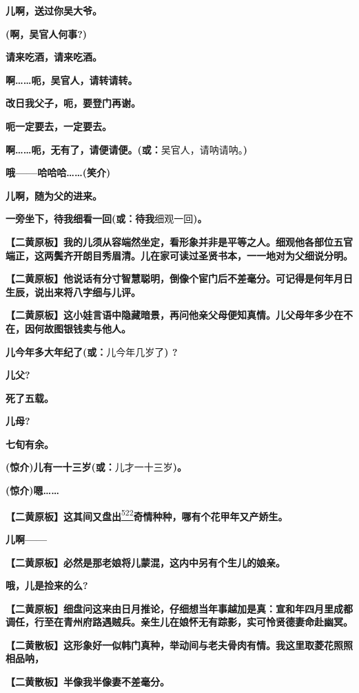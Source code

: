 \textbf{儿啊，送过你吴大爷。}

\textbf{(啊，吴官人何事?)}

\textbf{请来吃酒，请来吃酒。}

\textbf{啊\ldots{}\ldots{}呃，吴官人，请转请转。}

\textbf{改日我父子，呃，要登门再谢。}

\textbf{呃一定要去，一定要去。}

\textbf{啊\ldots{}\ldots{}呃，无有了，请便请便。(或：}吴官人，请呐请呐。\textbf{)}

\textbf{哦------哈哈哈\ldots{}\ldots{}(笑介)}

\textbf{儿啊，随为父的进来。}

\textbf{一旁坐下，待我细看一回(或：待我}细观一回\textbf{)。}

\textbf{【二黄原板】我的儿须从容端然坐定，看形象并非是平等之人。细观他各部位五官端正，这两鬓齐开朗目秀眉清。儿在家可读过圣贤书本，一一地对为父细说分明。}

\textbf{【二黄原板】他说话有分寸智慧聪明，倒像个宦门后不差毫分。可记得是何年月日生辰，说出来将八字细与儿评。}

\textbf{【二黄原板】这小娃言语中隐藏暗景，再问他亲父母便知真情。儿父母年多少在不在，因何故图银钱卖与他人。}

\textbf{儿今年多大年纪了(或：}儿今年几岁了\textbf{) ?}

\textbf{儿父?}

\textbf{死了五载。}

\textbf{儿母?}

\textbf{七旬有余。}

\textbf{(惊介)儿有一十三岁(或：}儿才一十三岁\textbf{)。}

\textbf{(惊介)嗯\ldots{}\ldots{}}

\textbf{【二黄原板】这其间又盘出}\protect\hyperlink{fn522}{\textsuperscript{522}}\textbf{奇情种种，哪有个花甲年又产娇生。}

\textbf{儿啊------}

\textbf{【二黄原板】必然是那老娘将儿蒙混，这内中另有个生儿的娘亲。}

\textbf{哦，儿是捡来的么?}

\textbf{【二黄原板】细盘问这来由日月推论，仔细想当年事越加是真：宣和年四月里成都调任，行至在青州府路遇贼兵。亲生儿在娘怀无有踪影，实可怜贤德妻命赴幽冥。}

\textbf{【二黄散板】这形象好一似韩门真种，举动间与老夫骨肉有情。我这里取菱花照照相品呐，}

\textbf{【二黄散板】半像我半像妻不差毫分。}

